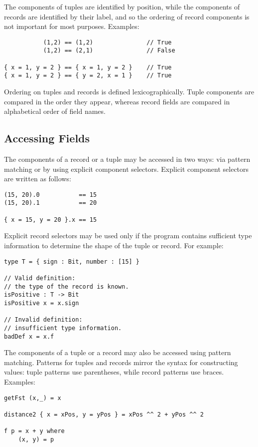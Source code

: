 The components of tuples are identified by position, while the
components of records are identified by their label, and so the ordering
of record components is not important for most purposes. Examples:

\begin{verbatim}
           (1,2) == (1,2)               // True
           (1,2) == (2,1)               // False

{ x = 1, y = 2 } == { x = 1, y = 2 }    // True
{ x = 1, y = 2 } == { y = 2, x = 1 }    // True
\end{verbatim}

Ordering on tuples and records is defined lexicographically. Tuple
components are compared in the order they appear, whereas record fields
are compared in alphabetical order of field names.

\subsection{Accessing Fields}\label{accessing-fields}

The components of a record or a tuple may be accessed in two ways: via
pattern matching or by using explicit component selectors. Explicit
component selectors are written as follows:

\begin{verbatim}
(15, 20).0           == 15
(15, 20).1           == 20

{ x = 15, y = 20 }.x == 15
\end{verbatim}

Explicit record selectors may be used only if the program contains
sufficient type information to determine the shape of the tuple or
record. For example:

\begin{verbatim}
type T = { sign : Bit, number : [15] }

// Valid definition:
// the type of the record is known.
isPositive : T -> Bit
isPositive x = x.sign

// Invalid definition:
// insufficient type information.
badDef x = x.f
\end{verbatim}

The components of a tuple or a record may also be accessed using pattern
matching. Patterns for tuples and records mirror the syntax for
constructing values: tuple patterns use parentheses, while record
patterns use braces. Examples:

\begin{verbatim}
getFst (x,_) = x

distance2 { x = xPos, y = yPos } = xPos ^^ 2 + yPos ^^ 2

f p = x + y where
    (x, y) = p
\end{verbatim}

